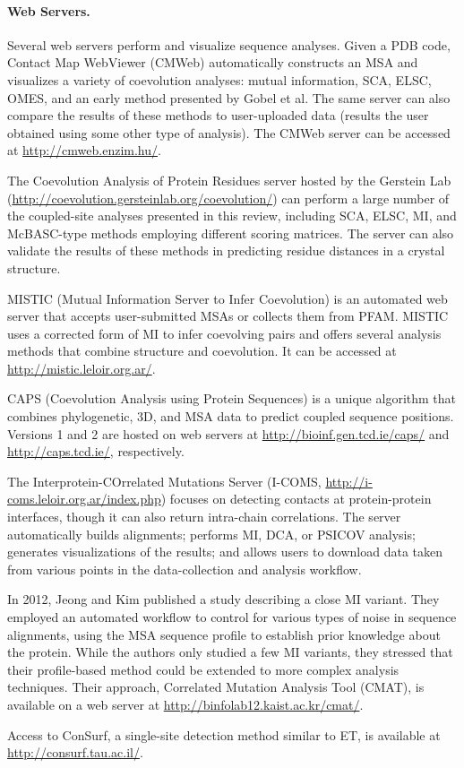 \paragraph{Web Servers.} Several web servers perform and visualize sequence analyses. Given a PDB code, Contact Map WebViewer (CMWeb)\cite{Kozma2012a} automatically constructs an MSA and visualizes a variety of coevolution analyses: mutual information, SCA, ELSC, OMES, and an early method presented by Gobel et al.\cite{Gobel1994a} The same server can also compare the results of these methods to user-uploaded data (\eg results the user obtained using some other type of analysis). The CMWeb server can be accessed at \url{http://cmweb.enzim.hu/}.
\par The Coevolution Analysis of Protein Residues server hosted by the Gerstein Lab\cite{Yip2008} (\url{http://coevolution.gersteinlab.org/coevolution/}) can perform a large number of the coupled-site analyses presented in this review, including SCA, ELSC, MI, and McBASC-type methods employing different scoring matrices. The server can also validate the results of these methods in predicting residue distances in a crystal structure.
\par MISTIC (Mutual Information Server to Infer Coevolution) is an automated web server that accepts user-submitted MSAs or collects them from PFAM.\cite{Simonetti2013a} MISTIC uses a corrected form of MI to infer coevolving pairs and offers several analysis methods that combine structure and coevolution.\cite{Buslje2009a} It can be accessed at \url{http://mistic.leloir.org.ar/}.
\par CAPS (Coevolution Analysis using Protein Sequences) is a unique algorithm that combines phylogenetic, 3D, and MSA data to predict coupled sequence positions.\cite{Fares2006a,Fares2006c} Versions 1 and 2 are hosted on web servers at \url{http://bioinf.gen.tcd.ie/caps/} and \url{http://caps.tcd.ie/}, respectively.
\par The Interprotein-COrrelated Mutations Server (I-COMS, \url{http://i-coms.leloir.org.ar/index.php}) focuses on detecting contacts at protein-protein interfaces, though it can also return intra-chain correlations.\cite{Iserte2015a} The server automatically builds alignments; performs MI, DCA, or PSICOV analysis; generates visualizations of the results; and allows users to download data taken from various points in the data-collection and analysis workflow.
\par In 2012, Jeong and Kim published a study describing a close MI variant.\cite{Jeong2012a} They employed an automated workflow to control for various types of noise in sequence alignments, using the MSA sequence profile to establish prior knowledge about the protein. While the authors only studied a few MI variants, they stressed that their profile-based method could be extended to more complex analysis techniques. Their approach, Correlated Mutation Analysis Tool (CMAT), is available on a web server at \url{http://binfolab12.kaist.ac.kr/cmat/}.
\par Access to ConSurf, a single-site detection method similar to ET, is available at \url{http://consurf.tau.ac.il/}.\cite{Berezin2004a,Glaser2003a,Landau2005,Armon2001,Ashkenazy2010a,Celniker2013a}
